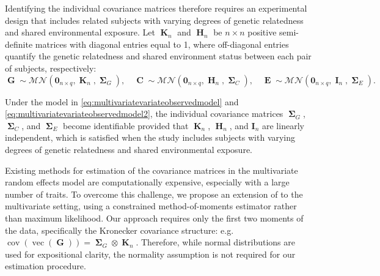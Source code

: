 \documentclass[12pt]{article}
\DeclareMathOperator{\G}{\mathbf{G}}
\DeclareMathOperator{\C}{\mathbf{C}}
\DeclareMathOperator{\E}{\mathbf{E}}
\DeclareMathOperator{\K}{\mathbf{K}}
\DeclareMathOperator{\Hn}{\mathbf{H}}
\DeclareMathOperator{\I}{\mathbf{I}}
\DeclareMathOperator{\bSigma}{\mathbf{\Sigma}}
\DeclareMathOperator{\vect}{vec}
\DeclareMathOperator{\cov}{cov}
\begin{document}
Identifying the individual covariance matrices therefore requires an experimental design that includes related subjects with varying degrees of genetic relatedness and shared environmental exposure. Let $\K_n$ and $\Hn_n$ be $n \times n$ positive semi-definite matrices with diagonal entries equal to 1, where off-diagonal entries quantify the genetic relatedness and shared environment status between each pair of subjects, respectively:
\begin{equation}
\label{eq:multivariatevariateobservedmodel2}
\G \sim \mathcal{MN}(\mathbf{0}_{n \times q}, \K_n, \bSigma_G), \quad \C \sim \mathcal{MN}(\mathbf{0}_{n \times q}, \Hn_n, \bSigma_C), \quad \E \sim \mathcal{MN}(\mathbf{0}_{n \times q}, \I_n, \bSigma_E).
\end{equation}

Under the model in \eqref{eq:multivariatevariateobservedmodel} and \eqref{eq:multivariatevariateobservedmodel2}, the individual covariance matrices $\bSigma_G$, $\bSigma_C$, and $\bSigma_E$ become identifiable provided that $\K_n$, $\Hn_n$, and $\mathbf{I}_n$ are linearly independent, which is satisfied when the study includes subjects with varying degrees of genetic relatedness and shared environmental exposure.

Existing methods for estimation of the covariance matrices in the multivariate random effects model are computationally expensive, especially with a large number of traits. To overcome this challenge, we propose an extension of \textcite{yue2021rehe} to the multivariate setting, using a constrained method-of-moments estimator rather than maximum likelihood. Our approach requires only the first two moments of the data, specifically the Kronecker covariance structure: e.g. $\cov(\vect(\G))=\bSigma_G \otimes \K_n$. Therefore, while normal distributions are used for expositional clarity, the normality assumption is not required for our estimation procedure.


\end{document}
